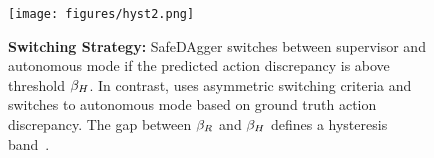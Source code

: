 

\begin{figure}[b!]
\center
\texttt{[image: figures/hyst2.png]}
\caption{
\textbf{\algname Switching Strategy:  }SafeDAgger switches between supervisor and autonomous mode if the predicted action discrepancy is above threshold $\beta_{H}$. In contrast, \algname uses asymmetric switching criteria and switches to autonomous mode based on ground truth action discrepancy. The gap between $\beta_{R}$ and $\beta_{H}$ defines a hysteresis band~\cite{hysteresis}.}%
\label{fig:hyst}
\end{figure}